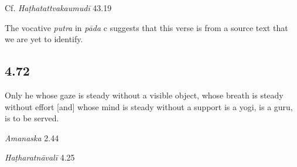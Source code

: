 \begin{ekdosis}
\begin{testimonia}[hp04_071]
Cf. \emph{Haṭhatattvakaumudī} 43.19
\begin{versinnote}
\end{versinnote}
\end{testimonia}

The vocative \emph{putra} in \emph{pāda} c suggests that this verse is from a source text that we are yet to identify.

\subsection*{4.72}
\begin{translation}[hp04_072]
Only he whose gaze is steady without a visible object, whose breath is steady without effort [and] whose mind is steady without a support is a yogi, is a guru, is to be served.
\end{translation}


\begin{sources}[hp04_072]
\emph{Amanaska} 2.44
\begin{versinnote}
\end{versinnote}
\end{sources}

\begin{testimonia}[hp04_072]
\emph{Haṭharatnāvalī} 4.25
\begin{versinnote}
\end{versinnote}


\end{testimonia}
\end{ekdosis}
